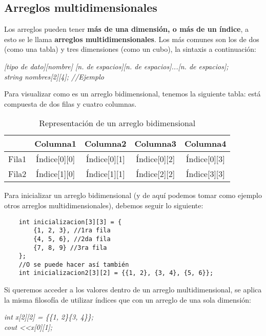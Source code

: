 \subsection{Arreglos multidimensionales}
Los arreglos pueden tener \textbf{más de una dimensión, o más de un índice}, a esto se le llama \textbf{arreglos multidimensionales}. Los más comunes son los de dos (como una tabla) y tres dimensiones (como un cubo), la sintaxis a continuación:
\begin{center}
    \textit{[tipo de dato][nombre] [n. de espacios][n. de espacios]...[n. de espacios];\\
            string nombres[2][4]; //Ejemplo}
\end{center}
Para visualizar como es un arreglo bidimensional, tenemos la siguiente tabla: está compuesta de dos filas y cuatro columnas.
\begin{table}[ht]
    \begin{center}
        \caption{Representación de un arreglo bidimensional}
        \label{tab: 5}
        \begin{tabular}{|c|c|c|c|c|}
            \hline
            &\textbf{Columna1}&\textbf{Columna2}&\textbf{Columna3}&\textbf{Columna4} \\ \hline
            Fila1&Índice[0][0]&Índice[0][1]&Índice[0][2]&Índice[0][3] \\ \hline
            Fila2&Índice[1][0]&Índice[1][1]&Índice[2][2]&Índice[3][3] \\
            \hline
        \end{tabular}
    \end{center}
\end{table}
Para inicializar un arreglo bidimensional (y de aquí podemos tomar como ejemplo otros arreglos multidimensionales), debemos seguir lo siguiente:
\begin{lstlisting}
    int inicializacion[3][3] = {
        {1, 2, 3}, //1ra fila
        {4, 5, 6}, //2da fila
        {7, 8, 9} //3ra fila
    };
    //O se puede hacer así también
    int inicializacion2[3][2] = {{1, 2}, {3, 4}, {5, 6}};
\end{lstlisting}
Si queremos acceder a los valores dentro de un arreglo multidimensional, se aplica la misma filosofía de utilizar índices que con un arreglo de una sola dimensión:\begin{center}\textit{int x[2][2] = \{\{1, 2\}\{3, 4\}\};\\cout \textless\textless x[0][1];}\end{center}



